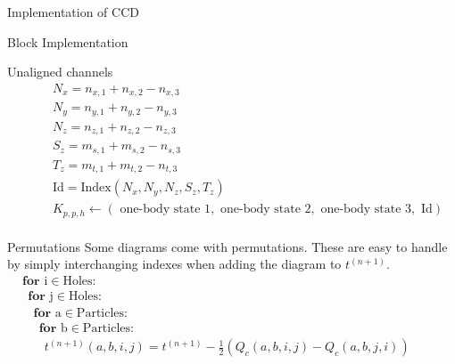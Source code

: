 \documentclass[twoside,english]{uiofysmaster}
\begin{document}
\begin{chapter}{Implementation of CCD}
\begin{section}{Block Implementation}
\begin{subsection}{Unaligned channels}
\begin{align*}
				&\:\:\:\:\:\:\:\: N_x = n_{x,1} + n_{x,2} - n_{x,3}\\
				&\:\:\:\:\:\:\:\: N_y = n_{y,1} + n_{y,2} - n_{y,3}\\
				&\:\:\:\:\:\:\:\: N_z = n_{z,1} + n_{z,2} - n_{z,3}\\
 				&\:\:\:\:\:\:\:\: S_z = m_{s,1} + m_{s,2} - n_{s,3}\\
				&\:\:\:\:\:\:\:\: T_z = m_{t,1} + m_{t,2} - n_{t,3}\\
				&\:\:\:\:\:\:\:\: \text{Id} = \text{Index}(N_x,N_y,N_z,S_z,T_z) \\
				&\:\:\:\:\:\:\:\: K_{p,p,h} \leftarrow (\text{ one-body state 1}, \text{ one-body state 2}, \text{ one-body state 3},  \text{ Id}) \\
			\end{align*}
		\end{subsection}

		\begin{subsection}{Permutations}
			Some diagrams come with permutations. These are easy to handle by simply interchanging indexes when adding the diagram to $t^{(n+1)}$. 
			\begin{align*}
				&\mathbf{for } \text{ i} \in \text{Holes}: \\
				&\:\:\mathbf{for } \text{ j} \in \text{Holes}: \\
				&\:\:\:\:\mathbf{for } \text{ a} \in \text{Particles}: \\
				&\:\:\:\:\:\:\mathbf{for } \text{ b} \in \text{Particles}: \\
				&\:\:\:\:\:\:\:\: t^{(n+1)}(a,b,i,j) = t^{(n+1)} - \frac{1}{2}\left(Q_c(a,b,i,j) - Q_c(a,b,j,i)\right) \:\:\:\:\:\:\:\:\:\:\:\:\:\:\:
			\end{align*}
		\end{subsection}

	\end{section}


\end{chapter}
\end{document}
